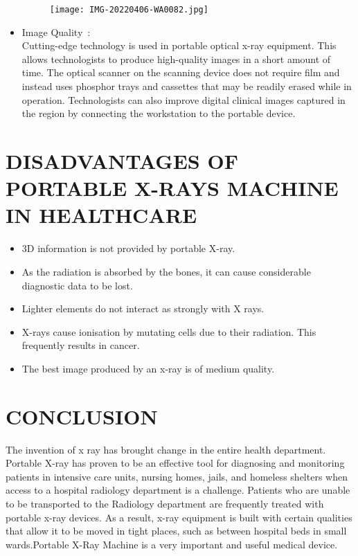 \documentclass[12pt]{article}
\begin{document}
\begin{itemize}
\begin{figure}
\centering
\texttt{[image: IMG-20220406-WA0082.jpg]}
\caption{}
\end{figure}
\item Image Quality :
\\
Cutting-edge technology is used in portable optical x-ray equipment. This allows technologists to produce high-quality images in a short amount of time.
The optical scanner on the scanning device does not require film and instead uses phosphor trays and cassettes that may be readily erased while in operation.
Technologists can also improve digital clinical images captured in the region by connecting the workstation to the portable device.
\end{itemize}
\section{DISADVANTAGES OF PORTABLE X-RAYS MACHINE IN HEALTHCARE}
\begin{itemize}
\item 3D information is not provided by portable X-ray.
\item As the radiation is absorbed by the bones, it can cause considerable diagnostic data to be lost.
\item Lighter elements do not interact as strongly with X rays.
\item X-rays cause ionisation by mutating cells due to their radiation. This frequently results in cancer.
\item The best image produced by an x-ray is of medium quality.
\end{itemize}

\section{CONCLUSION}

The invention of x ray has brought change in the entire health department. Portable X-ray has proven to be an effective tool for diagnosing and monitoring patients in intensive care units, nursing homes, jails, and homeless shelters when access to a hospital radiology department is a challenge. Patients who are unable to be transported to the Radiology department are frequently treated with portable x-ray devices. As a result, x-ray equipment is built with certain qualities that allow it to be moved in tight places, such as between hospital beds in small wards.Portable X-Ray Machine is a very important and useful medical device. 
\end{document}
